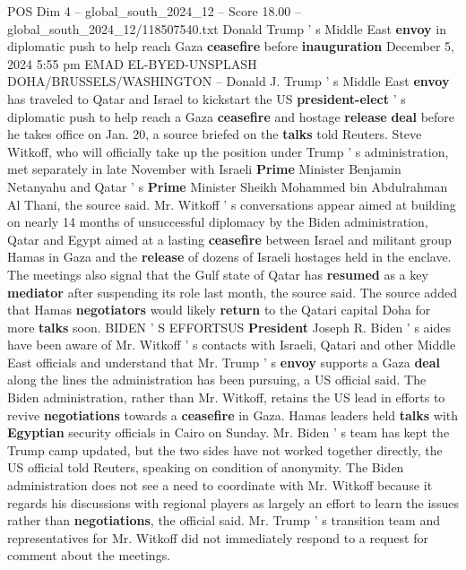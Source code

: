 \begin{textsample}{POS Dim 4 – global\_south\_2024\_12 – Score 18.00 – global\_south\_2024\_12/118507540.txt}  \label{ex:f4_pos_239}
Donald Trump ' s Middle East \textbf{envoy} in diplomatic push to help reach Gaza \textbf{ceasefire} before \textbf{inauguration} December 5, 2024 5:55 pm EMAD EL-BYED-UNSPLASH DOHA/BRUSSELS/WASHINGTON -- Donald J.
Trump ' s Middle East \textbf{envoy} has traveled to Qatar and Israel to kickstart the US \textbf{president-elect} ' s diplomatic push to help reach a Gaza \textbf{ceasefire} and hostage \textbf{release} \textbf{deal} before he takes office on Jan. 20, a source briefed on the \textbf{talks} told Reuters.
Steve Witkoff, who will officially take up the position under Trump ' s administration, met separately in late November with Israeli \textbf{Prime} Minister Benjamin Netanyahu and Qatar ' s \textbf{Prime} Minister Sheikh Mohammed bin Abdulrahman Al Thani, the source said.
Mr.
Witkoff ' s conversations appear aimed at building on nearly 14 months of unsuccessful diplomacy by the Biden administration, Qatar and Egypt aimed at a lasting \textbf{ceasefire} between Israel and militant group Hamas in Gaza and the \textbf{release} of dozens of Israeli hostages held in the enclave.
The meetings also signal that the Gulf state of Qatar has \textbf{resumed} as a key \textbf{mediator} after suspending its role last month, the source said.
The source added that Hamas \textbf{negotiators} would likely \textbf{return} to the Qatari capital Doha for more \textbf{talks} soon.
BIDEN ' S EFFORTSUS \textbf{President} Joseph R.
Biden ' s aides have been aware of Mr.
Witkoff ' s contacts with Israeli, Qatari and other Middle East officials and understand that Mr.
Trump ' s \textbf{envoy} supports a Gaza \textbf{deal} along the lines the administration has been pursuing, a US official said.
The Biden administration, rather than Mr.
Witkoff, retains the US lead in efforts to revive \textbf{negotiations} towards a \textbf{ceasefire} in Gaza.
Hamas leaders held \textbf{talks} with \textbf{Egyptian} security officials in Cairo on Sunday.
Mr.
Biden ' s team has kept the Trump camp updated, but the two sides have not worked together directly, the US official told Reuters, speaking on condition of anonymity.
The Biden administration does not see a need to coordinate with Mr.
Witkoff because it regards his discussions with regional players as largely an effort to learn the issues rather than \textbf{negotiations}, the official said.
Mr.
Trump ' s transition team and representatives for Mr.
Witkoff did not immediately respond to a request for comment about the meetings.

\end{textsample}
